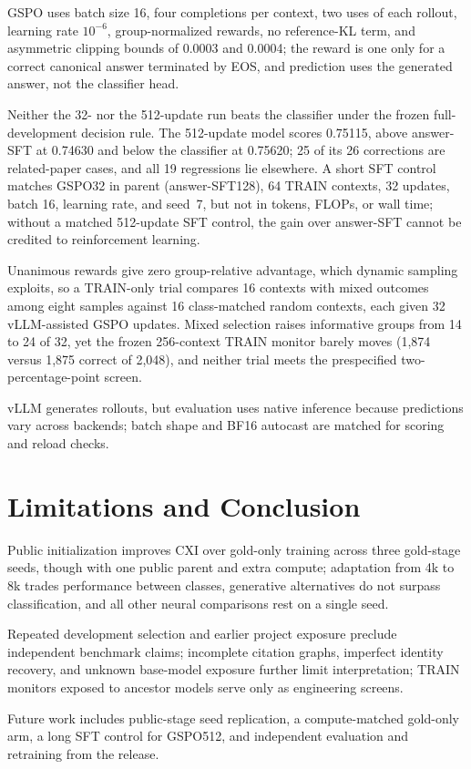 GSPO uses batch size 16, four completions per context, two uses of each rollout, learning rate $10^{-6}$, group-normalized rewards, no reference-KL term, and asymmetric clipping bounds of 0.0003 and 0.0004; the reward is one only for a correct canonical answer terminated by EOS, and prediction uses the generated answer, not the classifier head.

Neither the 32- nor the 512-update run beats the classifier under the frozen full-development decision rule. The 512-update model scores 0.75115, above answer-SFT at 0.74630 and below the classifier at 0.75620; 25 of its 26 corrections are related-paper cases, and all 19 regressions lie elsewhere. A short SFT control matches GSPO32 in parent (answer-SFT128), 64 TRAIN contexts, 32 updates, batch 16, learning rate, and seed~7, but not in tokens, FLOPs, or wall time; without a matched 512-update SFT control, the gain over answer-SFT cannot be credited to reinforcement learning.

Unanimous rewards give zero group-relative advantage, which dynamic sampling \citep{dapo} exploits, so a TRAIN-only trial compares 16 contexts with mixed outcomes among eight samples against 16 class-matched random contexts, each given 32 vLLM-assisted GSPO updates. Mixed selection raises informative groups from 14 to 24 of 32, yet the frozen 256-context TRAIN monitor barely moves (1,874 versus 1,875 correct of 2,048), and neither trial meets the prespecified two-percentage-point screen.

vLLM \citep{vllm} generates rollouts, but evaluation uses native inference because predictions vary across backends; batch shape and BF16 autocast are matched for scoring and reload checks.

\section{Limitations and Conclusion}

Public initialization improves CXI over gold-only training across three gold-stage seeds, though with one public parent and extra compute; adaptation from 4k to 8k trades performance between classes, generative alternatives do not surpass classification, and all other neural comparisons rest on a single seed.

Repeated development selection and earlier project exposure preclude independent benchmark claims; incomplete citation graphs, imperfect identity recovery, and unknown base-model exposure further limit interpretation; TRAIN monitors exposed to ancestor models serve only as engineering screens.

Future work includes public-stage seed replication, a compute-matched gold-only arm, a long SFT control for GSPO512, and independent evaluation and retraining from the release.
